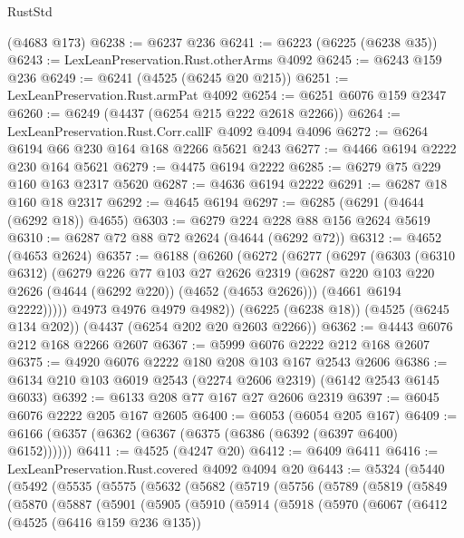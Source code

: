 \begin{lexlean}{RustStd}
\begin{coremodule}
    (@4683 @173)
@6238 := @6237 @236
@6241 := @6223 (@6225 (@6238 @35))
@6243 := LexLeanPreservation.Rust.otherArms @4092
@6245 := @6243 @159 @236
@6249 := @6241 (@4525 (@6245 @20 @215))
@6251 := LexLeanPreservation.Rust.armPat @4092
@6254 := @6251 @6076 @159 @2347
@6260 := @6249 (@4437 (@6254 @215 @222 @2618 @2266))
@6264 := LexLeanPreservation.Rust.Corr.callF @4092 @4094 @4096
@6272 := @6264 @6194 @66 @230 @164 @168 @2266 @5621 @243
@6277 := @4466 @6194 @2222 @230 @164 @5621
@6279 := @4475 @6194 @2222
@6285 := @6279 @75 @229 @160 @163 @2317 @5620
@6287 := @4636 @6194 @2222
@6291 := @6287 @18 @160 @18 @2317
@6292 := @4645 @6194
@6297 := @6285 (@6291 (@4644 (@6292 @18)) @4655)
@6303 := @6279 @224 @228 @88 @156 @2624 @5619
@6310 := @6287 @72 @88 @72 @2624 (@4644 (@6292 @72))
@6312 := @4652 (@4653 @2624)
@6357 := @6188
    (@6260
      (@6272
        (@6277
          (@6297
            (@6303
              (@6310 @6312)
              (@6279
                @226
                @77
                @103
                @27
                @2626
                @2319
                (@6287 @220 @103 @220 @2626 (@4644 (@6292 @220)) (@4652 (@4653 @2626)))
                (@4661 @6194 @2222)))))
        @4973
        @4976
        @4979
        @4982))
    (@6225 (@6238 @18))
    (@4525 (@6245 @134 @202))
    (@4437 (@6254 @202 @20 @2603 @2266))
@6362 := @4443 @6076 @212 @168 @2266 @2607
@6367 := @5999 @6076 @2222 @212 @168 @2607
@6375 := @4920 @6076 @2222 @180 @208 @103 @167 @2543 @2606
@6386 := @6134 @210 @103 @6019 @2543 (@2274 @2606 @2319) (@6142 @2543 @6145 @6033)
@6392 := @6133 @208 @77 @167 @27 @2606 @2319
@6397 := @6045 @6076 @2222 @205 @167 @2605
@6400 := @6053 (@6054 @205 @167)
@6409 := @6166 (@6357 (@6362 (@6367 (@6375 (@6386 (@6392 (@6397 @6400) @6152))))))
@6411 := @4525 (@4247 @20)
@6412 := @6409 @6411
@6416 := LexLeanPreservation.Rust.covered @4092 @4094 @20
@6443 := @5324
    (@5440
      (@5492
        (@5535
          (@5575
            (@5632
              (@5682
                (@5719
                  (@5756
                    (@5789
                      (@5819
                        (@5849
                          (@5870
                            (@5887
                              (@5901
                                (@5905
                                  (@5910
                                    (@5914
                                      (@5918
                                        (@5970
                                          (@6067
                                            (@6412
                                              (@4525 (@6416 @159 @236 @135))

\end{coremodule}
\end{lexlean}
